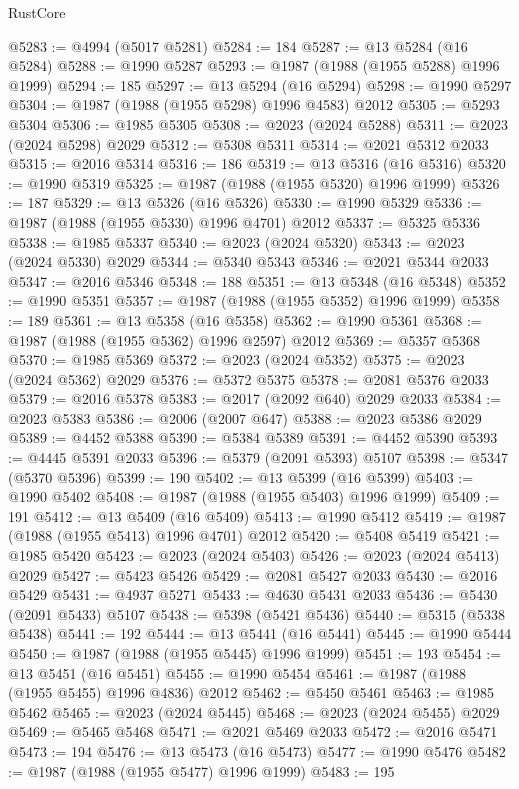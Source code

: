 \begin{lexlean}{RustCore}
\begin{coremodule}
@5283 := @4994 (@5017 @5281)
@5284 := 184
@5287 := @13 @5284 (@16 @5284)
@5288 := @1990 @5287
@5293 := @1987 (@1988 (@1955 @5288) @1996 @1999)
@5294 := 185
@5297 := @13 @5294 (@16 @5294)
@5298 := @1990 @5297
@5304 := @1987 (@1988 (@1955 @5298) @1996 @4583) @2012
@5305 := @5293 @5304
@5306 := @1985 @5305
@5308 := @2023 (@2024 @5288)
@5311 := @2023 (@2024 @5298) @2029
@5312 := @5308 @5311
@5314 := @2021 @5312 @2033
@5315 := @2016 @5314
@5316 := 186
@5319 := @13 @5316 (@16 @5316)
@5320 := @1990 @5319
@5325 := @1987 (@1988 (@1955 @5320) @1996 @1999)
@5326 := 187
@5329 := @13 @5326 (@16 @5326)
@5330 := @1990 @5329
@5336 := @1987 (@1988 (@1955 @5330) @1996 @4701) @2012
@5337 := @5325 @5336
@5338 := @1985 @5337
@5340 := @2023 (@2024 @5320)
@5343 := @2023 (@2024 @5330) @2029
@5344 := @5340 @5343
@5346 := @2021 @5344 @2033
@5347 := @2016 @5346
@5348 := 188
@5351 := @13 @5348 (@16 @5348)
@5352 := @1990 @5351
@5357 := @1987 (@1988 (@1955 @5352) @1996 @1999)
@5358 := 189
@5361 := @13 @5358 (@16 @5358)
@5362 := @1990 @5361
@5368 := @1987 (@1988 (@1955 @5362) @1996 @2597) @2012
@5369 := @5357 @5368
@5370 := @1985 @5369
@5372 := @2023 (@2024 @5352)
@5375 := @2023 (@2024 @5362) @2029
@5376 := @5372 @5375
@5378 := @2081 @5376 @2033
@5379 := @2016 @5378
@5383 := @2017 (@2092 @640) @2029 @2033
@5384 := @2023 @5383
@5386 := @2006 (@2007 @647)
@5388 := @2023 @5386 @2029
@5389 := @4452 @5388
@5390 := @5384 @5389
@5391 := @4452 @5390
@5393 := @4445 @5391 @2033
@5396 := @5379 (@2091 @5393) @5107
@5398 := @5347 (@5370 @5396)
@5399 := 190
@5402 := @13 @5399 (@16 @5399)
@5403 := @1990 @5402
@5408 := @1987 (@1988 (@1955 @5403) @1996 @1999)
@5409 := 191
@5412 := @13 @5409 (@16 @5409)
@5413 := @1990 @5412
@5419 := @1987 (@1988 (@1955 @5413) @1996 @4701) @2012
@5420 := @5408 @5419
@5421 := @1985 @5420
@5423 := @2023 (@2024 @5403)
@5426 := @2023 (@2024 @5413) @2029
@5427 := @5423 @5426
@5429 := @2081 @5427 @2033
@5430 := @2016 @5429
@5431 := @4937 @5271
@5433 := @4630 @5431 @2033
@5436 := @5430 (@2091 @5433) @5107
@5438 := @5398 (@5421 @5436)
@5440 := @5315 (@5338 @5438)
@5441 := 192
@5444 := @13 @5441 (@16 @5441)
@5445 := @1990 @5444
@5450 := @1987 (@1988 (@1955 @5445) @1996 @1999)
@5451 := 193
@5454 := @13 @5451 (@16 @5451)
@5455 := @1990 @5454
@5461 := @1987 (@1988 (@1955 @5455) @1996 @4836) @2012
@5462 := @5450 @5461
@5463 := @1985 @5462
@5465 := @2023 (@2024 @5445)
@5468 := @2023 (@2024 @5455) @2029
@5469 := @5465 @5468
@5471 := @2021 @5469 @2033
@5472 := @2016 @5471
@5473 := 194
@5476 := @13 @5473 (@16 @5473)
@5477 := @1990 @5476
@5482 := @1987 (@1988 (@1955 @5477) @1996 @1999)
@5483 := 195

\end{coremodule}
\end{lexlean}
